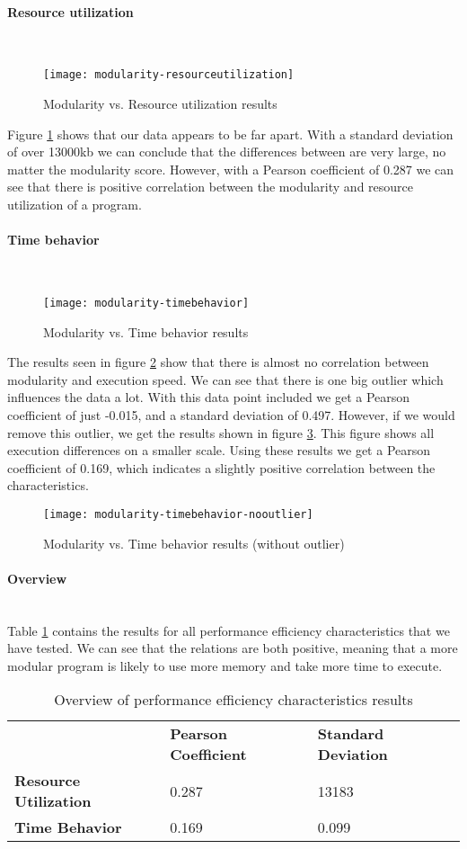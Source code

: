 \documentclass[twoside]{uva-inf-bachelor-thesis}
\newcommand{\myparagraph}[1]{\paragraph{#1}\mbox{}\\}
\begin{document}
\myparagraph{Resource utilization}
\begin{figure}[H]
    \label{figure:perf-res}
    \caption{Modularity vs. Resource utilization results}
    \centering
        \texttt{[image: modularity-resourceutilization]}
\end{figure}

Figure \ref{figure:perf-res} shows that our data appears  to be far apart. With a standard deviation of over 13000kb we can conclude  that the differences between are very large, no matter the modularity score. However, with a Pearson coefficient of 0.287 we can see that there is positive correlation  between the modularity and resource utilization of a program.

\myparagraph{Time behavior}
\begin{figure}[H]
    \label{figure:perf-time}
    \caption{Modularity vs. Time behavior results}
    \centering
        \texttt{[image: modularity-timebehavior]}
\end{figure}

The results seen in figure \ref{figure:perf-time} show that there is almost  no correlation between modularity and execution speed. We can see that there is one big outlier which influences the data a lot. With this data point included we get a Pearson coefficient of just -0.015, and a standard deviation of 0.497. However, if we would remove this outlier, we get the results shown in figure \ref{figure:perf-time-no}. This figure shows all execution differences on a smaller scale. Using these results we get a Pearson coefficient of 0.169, which indicates a slightly positive correlation between the characteristics.

\begin{figure}[H]
    \label{figure:perf-time-no}
    \caption{Modularity vs. Time behavior results (without outlier)}
    \centering
        \texttt{[image: modularity-timebehavior-nooutlier]}
\end{figure}

\myparagraph{Overview}
Table \ref{table:perf-overview} contains the results for all performance efficiency characteristics that we have tested. We can see that the relations are both positive, meaning that a more modular program is likely to use more memory and take more time to execute.

\begin{table}[H]
\centering
\caption{Overview of performance efficiency characteristics results}
\label{table:perf-overview}
\begin{tabular}{lll}
                              & \textbf{Pearson Coefficient} & \textbf{Standard Deviation} \\
\textbf{Resource Utilization} & 0.287                        & 13183                       \\
\textbf{Time Behavior}        & 0.169                        & 0.099                      
\end{tabular}
\end{table}
\end{document}
